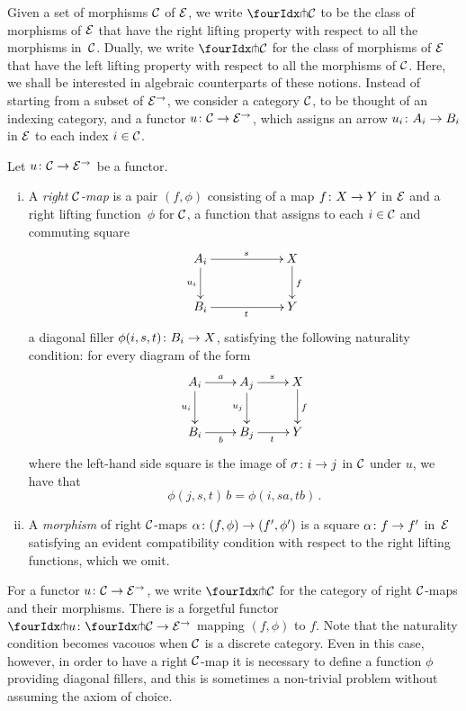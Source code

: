 \documentclass[reqno,10pt,a4paper,oneside]{amsart}
\begin{document}
Given a set of morphisms $\cal{C}$ of $\catE$, we 
write $\liftr{\cal{C}}$ to be the class of morphisms of $\catE$ that have 
the right lifting property with respect to all the morphisms in~$\cal{C}$. Dually, we write $\liftl{\cal{C}}$ for the class of morphisms of $\catE$ that have the left lifting property with respect to all the morphisms of $\cal{C}$. 
Here, we shall be interested in algebraic counterparts of these notions. Instead of starting from a subset of $\catE^\to$, we consider a category $\cal{C}$, to be thought of an indexing category, and a functor $u \co \cal{C} \to \catE^\to$, which assigns an arrow $u_i \co A_i \to B_i$ in $\catE$ to each index $i \in \cal{C}$.


 \begin{definition} Let $u \co \cal{C} \to \catE^\to$ be a functor. 
 \begin{enumerate}[(i)] 
 \item  A \emph{right $\cal{C}$-map}
 is a pair $(f, \phi)$ consisting of a map $f \co X \to Y$ in $\cal{E}$ and a right lifting function~$\phi$ for $\cal{C}$, \ie 
 a function that assigns to each $i \in \cal{C}$ and commuting square
\[
\xymatrix@C=2cm{
A_i \ar[r]^{s}   \ar[d]_{u_i} & X \ar[d]^f \\
B_i \ar[r]_{t} & Y}
\]
a diagonal filler $\phi(i,s, t) \co B_i \to X$, satisfying the following naturality 
condition: for every diagram of the form
\[
\xymatrix{
A_i \ar[r]^a \ar[d]_{u_i} & A_j \ar[r]^{s}  \ar[d]_{u_j} & X \ar[d]^f   \\
B_i \ar[r]_{b}  & B_j  \ar[r]_{t}  & Y }
\]
where the left-hand side square is the image of $\sigma \co i \to j$ in $\cal{C}$ under $u$, 
we have that 
\[
\phi(j, s, t) \, b = \phi(i, s  a, t  b) \, .
\]
\item A \emph{morphism} of right $\cal{C}$-maps $\alpha \co (f, \phi) \to (f', \phi')$ is a 
square $\alpha \co f \to f'$ in~$\catE$ satisfying an evident compatibility condition 
with respect to the right lifting functions, which we omit. 
\end{enumerate}
\end{definition}

For a functor $u \co \cal{C} \to \catE^\to$, we write $\liftr{\cal{C}}$ for the category  of 
right $\cal{C}$-maps and their morphisms. There is a forgetful functor~$\liftr{u} \co \liftr{\cal{C}} \to \catE^\to$
mapping $(f, \phi)$ to $f$. Note that the naturality condition becomes vacouos when $\cal{C}$ is a discrete category. Even in this case, however, in order to have a right $\cal{C}$-map it is necessary to define a function $\phi$ providing 
diagonal fillers, and this is sometimes a non-trivial problem without assuming the axiom of choice.
\end{document}
